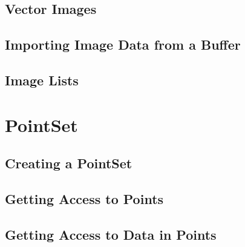 \subsection{Vector Images}
\label{sec:DefiningVectorImages}




\subsection{Importing Image Data from a Buffer}
\label{sec:ImportingImageDataFromABuffer}


\subsection{Image Lists}
\label{sec:ImageLists}




\section{PointSet}
\label{sec:PointSetSection}

\subsection{Creating a PointSet}
\label{sec:CreatingAPointSet}





\subsection{Getting Access to Points}
\label{sec:GettingAccessToPointsInThePointSet}





\subsection{Getting Access to Data in Points}
\label{sec:GettingAccessToDataInThePointSet}






